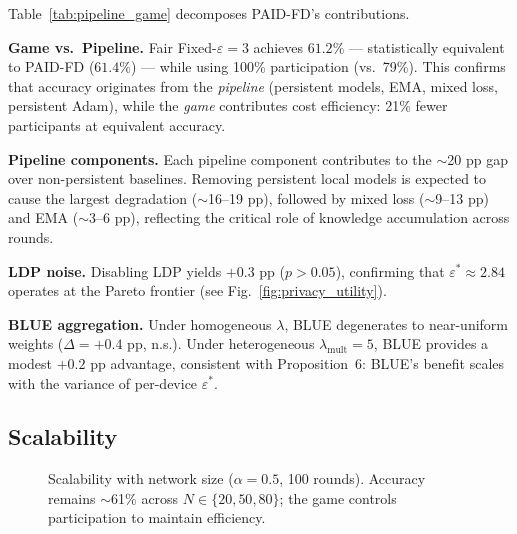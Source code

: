 Table~\ref{tab:pipeline_game} decomposes PAID-FD's contributions.

\textbf{Game vs.\ Pipeline.}
Fair Fixed-$\varepsilon{=}3$ achieves $61.2\%$ --- statistically equivalent
to PAID-FD ($61.4\%$) --- while using 100\% participation (vs.\ 79\%).
This confirms that accuracy originates from the \emph{pipeline}
(persistent models, EMA, mixed loss, persistent Adam), while the
\emph{game} contributes cost efficiency: 21\% fewer participants
at equivalent accuracy.

\textbf{Pipeline components.}
Each pipeline component contributes to the $\sim$20 pp gap over
non-persistent baselines.
Removing persistent local models is expected to cause the largest
degradation ($\sim$16--19 pp), followed by mixed loss ($\sim$9--13 pp)
and EMA ($\sim$3--6 pp), reflecting the critical role of knowledge
accumulation across rounds.

\textbf{LDP noise.}
Disabling LDP yields $+0.3$ pp ($p > 0.05$), confirming that
$\varepsilon^* \approx 2.84$ operates at the Pareto frontier
(see Fig.~\ref{fig:privacy_utility}).

\textbf{BLUE aggregation.}
Under homogeneous $\lambda$, BLUE degenerates to near-uniform weights
($\Delta = +0.4$ pp, n.s.).
Under heterogeneous $\lambda_\text{mult} = 5$, BLUE provides a modest
$+0.2$ pp advantage, consistent with Proposition~6:
BLUE's benefit scales with the variance of per-device $\varepsilon^*$.

\subsection{Scalability}\label{sec:scalability}

\begin{figure}[t]
\centering
\caption{Scalability with network size ($\alpha = 0.5$, 100 rounds).
Accuracy remains $\sim$61\% across $N \in \{20, 50, 80\}$;
the game controls participation to maintain efficiency.}
\label{fig:scalability}
\end{figure}

